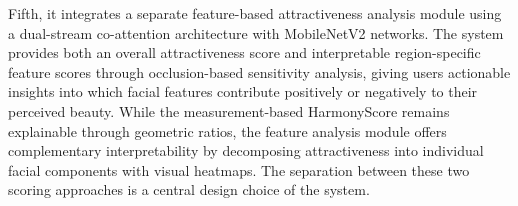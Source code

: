 Fifth, it integrates a separate feature-based attractiveness analysis module using a dual-stream co-attention architecture with MobileNetV2 networks. The system provides both an overall attractiveness score and interpretable region-specific feature scores through occlusion-based sensitivity analysis, giving users actionable insights into which facial features contribute positively or negatively to their perceived beauty. While the measurement-based HarmonyScore remains explainable through geometric ratios, the feature analysis module offers complementary interpretability by decomposing attractiveness into individual facial components with visual heatmaps. The separation between these two scoring approaches is a central design choice of the system.
